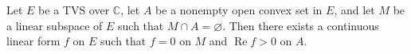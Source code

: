 Let $E$ be a TVS over $\mathbb{C}$, let $A$ be a nonempty open convex set in $E$, and let $M$ be a linear subspace of $E$ such that $M \cap A = \varnothing$. Then there exists a continuous linear form $f$ on $E$ such that $f = 0$ on $M$ and $\operatorname{Re} f > 0$ on $A$.